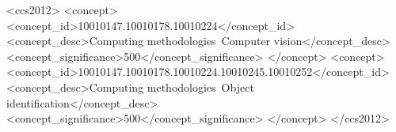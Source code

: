 \documentclass[sigconf, authordraft,review=false]{acmart}
\begin{document}
%
%


\begin{CCSXML}
<ccs2012>
<concept>
<concept_id>10010147.10010178.10010224</concept_id>
<concept_desc>Computing methodologies~Computer vision</concept_desc>
<concept_significance>500</concept_significance>
</concept>
<concept>
<concept_id>10010147.10010178.10010224.10010245.10010252</concept_id>
<concept_desc>Computing methodologies~Object identification</concept_desc>
<concept_significance>500</concept_significance>
</concept>
</ccs2012>
\end{CCSXML}





\maketitle
\end{document}
